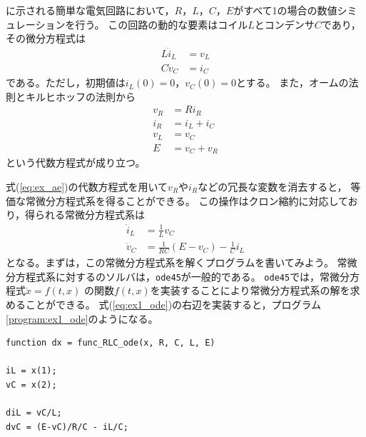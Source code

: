 \documentclass[tombow,dvipdfmx]{corona-a5-1.1}
\begin{document}
\begin{例}[簡単な微分代数方程式系の数値解法]\label{ex:dae_ex1}
に示される簡単な電気回路において，$R$，$L$，$C$，$E$がすべて1の場合の数値シミュレーションを行う。
この回路の動的な要素はコイル$L$とコンデンサ$C$であり，その微分方程式は
\begin{subequations}\label{eq:ex_de}
  \begin{align}
    L\dot i_L & = v_L \\
    C\dot v_C & = i_C
  \end{align}
\end{subequations}
である。ただし，初期値は$i_L(0)=0$，$v_C(0)=0$とする。
また，オームの法則とキルヒホッフの法則から
\begin{subequations}\label{eq:ex_ae}
  \begin{align}
    v_R & =R i_R      \\
    i_R & = i_L + i_C \\
    v_L & = v_C       \\
    E   & = v_C + v_R
  \end{align}
\end{subequations}
という代数方程式が成り立つ。

式(\ref{eq:ex_ae})の代数方程式を用いて$v_R$や$i_R$などの冗長な変数を消去すると，
等価な常微分方程式系を得ることができる。
この操作はクロン縮約に対応しており，得られる常微分方程式系は
\begin{subequations}\label{eq:ex1_ode}
  \begin{align}
    \dot{i}_L & = \frac{1}{L}v_C                     \\
    \dot{v}_C & = \frac{1}{RC}(E-v_C)-\frac{1}{C}i_L
  \end{align}
\end{subequations}
となる。まずは，この常微分方程式系を解くプログラムを書いてみよう。
常微分方程式系に対する\matlab のソルバは，\verb|ode45|が一般的である。
\verb|ode45|では，常微分方程式$\dot{x} = f(t, x)$
の関数$f(t, x)$を実装することにより常微分方程式系の解を求めることができる。
式(\ref{eq:ex1_ode})の右辺を実装すると，プログラム\ref{program:ex1_ode}のようになる。

\smallskip
\begin{PROGRAMA}[count,title={func\_RLC\_ode.m}]\label{program:ex1_ode}
  \begin{verbatim}
function dx = func_RLC_ode(x, R, C, L, E)

iL = x(1);
vC = x(2);

diL = vC/L;
dvC = (E-vC)/R/C - iL/C;


\end{verbatim}
\end{PROGRAMA}
\end{例}
\end{document}
